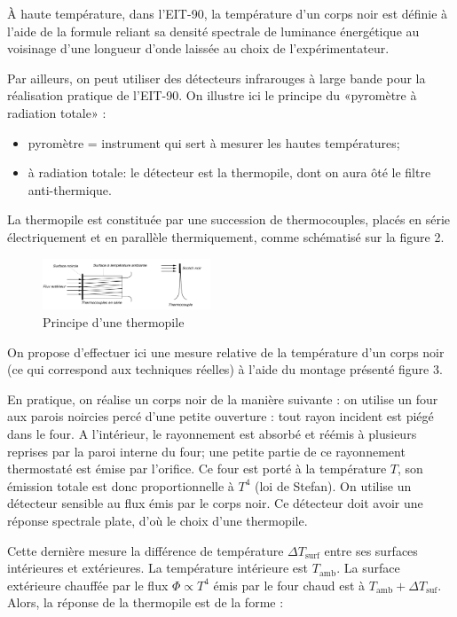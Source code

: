 \documentclass{article}%
\begin{document}
À haute température, dans l'EIT-90, la température d'un corps noir est définie à l'aide de la formule reliant sa densité spectrale de luminance énergétique au voisinage d'une longueur d'onde laissée au choix de l'expérimentateur.

Par ailleurs, on peut utiliser des détecteurs infrarouges à large bande pour la réalisation pratique de l'EIT-90. On illustre ici le principe du «pyromètre à radiation totale» :
\begin{itemize}
\item pyromètre = instrument qui sert à mesurer les hautes températures;
\item à radiation totale: le détecteur est la thermopile, dont on aura ôté le filtre anti-thermique.
\end{itemize}
La thermopile est constituée par une succession de thermocouples, placés en série électriquement et en parallèle thermiquement, comme schématisé sur la figure 2.

\begin{figure}
	\centerline{\includegraphics[width=5cm]{images-exp/ThermometriePrincipeThermopile_new.png}}
	\caption{Principe d'une thermopile}
\end{figure}

On propose d'effectuer ici une mesure relative de la température d'un corps noir (ce qui correspond aux techniques réelles) à l'aide du montage présenté figure 3. 

En pratique, on réalise un corps noir de la manière suivante : on utilise un four aux parois noircies percé d'une petite ouverture : tout rayon incident est piégé dans le four. A l'intérieur, le rayonnement est absorbé et réémis à plusieurs reprises par la paroi interne du four; une petite partie de ce rayonnement thermostaté est émise par l'orifice. Ce four est porté à la température $T$, son émission totale est donc proportionnelle à $T^4$ (loi de Stefan). On utilise un détecteur sensible au flux émis par le corps noir. Ce détecteur doit avoir une réponse spectrale plate, d'où le choix d'une thermopile.

Cette dernière mesure la différence de température $\Delta T_{\textrm{surf}}$ entre ses surfaces intérieures et extérieures. La température intérieure est $T_{\textrm{amb}}$. La surface extérieure chauffée par le flux $\Phi \propto T^4$ émis par le four chaud est à $T_{\textrm{amb}} + \Delta T_{\textrm{suf}}$. Alors, la réponse de la thermopile est de la forme :
\end{document}
